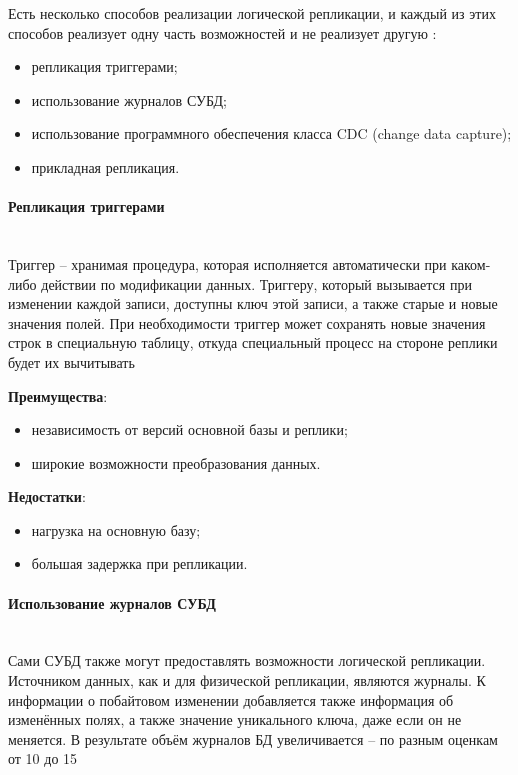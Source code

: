 Есть несколько способов реализации логической репликации, и каждый из этих способов реализует одну часть возможностей и
не реализует другую \autocite{PhysLogPeplic}:
\begin{itemize}
    \item репликация триггерами;
    \item использование журналов СУБД;
    \item использование программного обеспечения класса CDC (change data capture);
    \item прикладная репликация.
\end{itemize}

\paragraph{Репликация триггерами} ~\\
Триггер – хранимая процедура, которая исполняется автоматически при каком-либо действии по модификации данных. Триггеру,
который вызывается при изменении каждой записи, доступны ключ этой записи, а также старые и новые значения полей. При
необходимости триггер может сохранять новые значения строк в специальную таблицу, откуда специальный процесс на стороне
реплики будет их вычитывать

\textbf{Преимущества}:
\begin{itemize}
    \item независимость от версий основной базы и реплики;
    \item широкие возможности преобразования данных.
\end{itemize}

\textbf{Недостатки}:
\begin{itemize}
    \item нагрузка на основную базу;
    \item большая задержка при репликации.
\end{itemize}

\paragraph{Использование журналов СУБД} ~\\
Сами СУБД также могут предоставлять возможности логической репликации. Источником данных, как и для физической
репликации, являются журналы. К информации о побайтовом изменении добавляется также информация об изменённых полях, а
также значение уникального ключа, даже если он не меняется. В результате объём журналов БД увеличивается – по разным
оценкам от 10 до 15%

